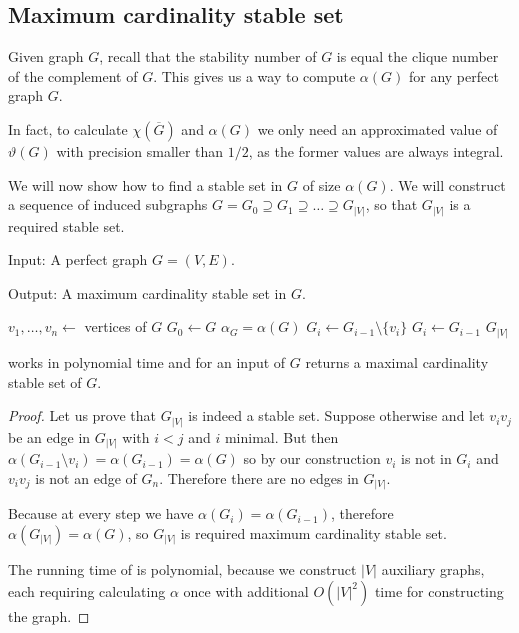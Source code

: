 \subsection{Maximum cardinality stable set}

Given graph $G$, recall that the stability number of $G$ is equal the clique number of the complement of $G$. This gives us a way to compute $\alpha(G)$ for any perfect graph $G$.

In fact, to calculate $\chi(\overline{G})$ and $\alpha(G)$ we only need an approximated value of $\vartheta(G)$ with precision smaller than $1/2$, as the former values are always integral.

We will now show how to find a stable set in $G$ of size $\alpha(G)$. We will construct a sequence of induced subgraphs $G = G_0 \supseteq G_1 \supseteq \ldots \supseteq G_{|V|}$, so that $G_{|V|}$ is a required stable set.

\begin{alg}
  \label{alg:maxStableSet}
  Input: A perfect graph $G = (V, E)$.

  \noindent Output: A maximum cardinality stable set in $G$.
\end{alg}

\begin{algorithmic}[1]
  \ls $v_1, \ldots, v_n \gets$ vertices of $G$
  \ls $G_0 \leftarrow G$
  \ls $\alpha_G = \alpha(G)$
  \ls $G_i \leftarrow G_{i-1} \setminus \{v_i\}$
  \mElse
  \ls $G_i \leftarrow G_{i-1}$
  \mEndIf
  \mEndFor
  \ls \RETURN $G_{|V|}$
  \mEndProcedure
\end{algorithmic}

\begin{theorem}
   works in polynomial time and for an input of $G$ returns a maximal cardinality stable set of $G$.
\end{theorem}
\begin{proof}
  Let us prove that $G_{|V|}$ is indeed a stable set. Suppose otherwise and let $v_iv_j$ be an edge in $G_{|V|}$ with $i < j$ and $i$ minimal. But then $\alpha(G_{i-1} \setminus v_i) = \alpha(G_{i-1}) = \alpha(G)$ so by our construction $v_i$ is not in $G_i$ and $v_iv_j$ is not an edge of $G_n$. Therefore there are no edges in $G_{|V|}$.

  Because at every step we have $\alpha(G_i) = \alpha(G_{i-1})$, therefore $\alpha(G_{|V|}) = \alpha(G)$, so $G_{|V|}$ is required maximum cardinality stable set.

  The running time of  is polynomial, because we construct $|V|$ auxiliary graphs, each requiring calculating $\alpha$ once with additional $O(|V|^2)$ time for constructing the graph.
\end{proof}

